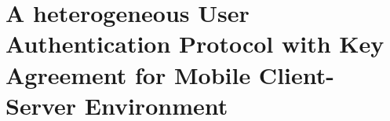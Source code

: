 
\chapter{A heterogeneous User Authentication Protocol with Key Agreement for Mobile Client-Server Environment}
\label{Ch5}
